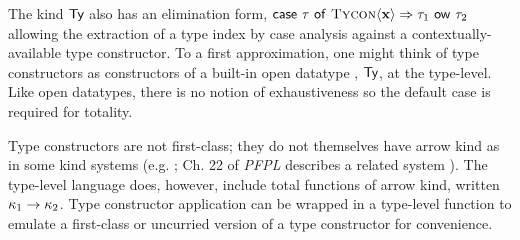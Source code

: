 
The kind $\textsf{Ty}$ also has an elimination form, ${\sf case}~\tau~{\sf of}~\textsc{Tycon}\langle{\textbf{x}}\rangle\Rightarrow\tau_1~{\sf ow}~\tau_2$ allowing the extraction of a type index by case analysis against a contextually-available type constructor. To a first approximation, one might think of type constructors as constructors of a built-in open datatype \cite{conf/ppdp/LohH06}, $\textsf{Ty}$, at the type-level. Like open datatypes, there is no notion of exhaustiveness so the default case is required for totality. %






 
 Type constructors are not first-class; they do not themselves have arrow kind as in some kind systems (e.g.  \cite{watkins2008specifying}; Ch. 22 of \emph{PFPL} describes a related system \cite{pfpl}). The type-level language does, however, include total functions of arrow kind, written $\kappa_1\rightarrow{\kappa_2}$. Type constructor application can be wrapped in a type-level function to emulate a first-class or uncurried version of a type constructor for convenience.%

